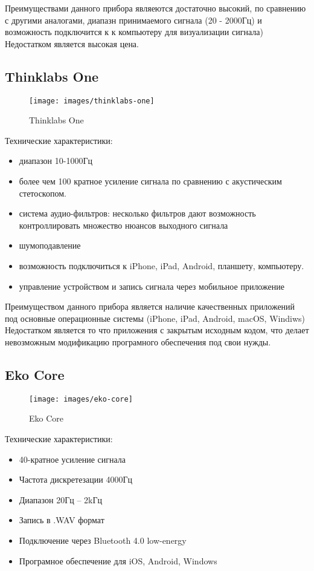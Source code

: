 \documentclass[../main.tex]{subfiles}
\begin{document}
Преимуществами данного прибора являеются достаточно высокий, по сравнению с другими аналогами, диапазн принимаемого сигнала (20 - 2000Гц) и возможность подключится к к компьютеру для визуализации сигнала) Недостатком является высокая цена.

\subsection{Thinklabs One}
\begin{figure}[H]
\centering
\texttt{[image: images/thinklabs-one]}
\caption{Thinklabs One}
\end{figure}

Технические характеристики:\cite{thinklabs-one}
\begin{itemize}
  \item диапазон 10-1000Гц
  \item более чем 100 кратное усиление сигнала по сравнению с акустическим стетоскопом.
  \item система аудио-фильтров: несколько фильтров дают возможность контроллировать множество нюансов выходного сигнала
  \item шумоподавление
  \item возможность подключиться к iPhone, iPad, Android, планшету, компьютеру.
  \item управление устройством и запись сигнала через мобильное приложение
\end{itemize}

Преимуществом данного прибора является наличие качественных приложений под основные операционные системы (iPhone, iPad, Android, macOS, Windiws) Недостатком является то что приложения с закрытым исходным кодом, что делает невозможным модификацию програмного обеспечения под свои нужды.

\subsection{Eko Core}
\begin{figure}[H]
\centering
\texttt{[image: images/eko-core]}
\caption{Eko Core}
\end{figure}

Технические характеристики:\cite{eko-core}
\begin{itemize}
  \item 40-кратное усиление сигнала
  \item Частота дискретезации 4000Гц
  \item Диапазон 20Гц – 2kГц
  \item Запись в .WAV формат
  \item Подключение через Bluetooth 4.0 low-energy
  \item Програмное обеспечение для iOS, Android, Windows
\end{itemize}
\end{document}
